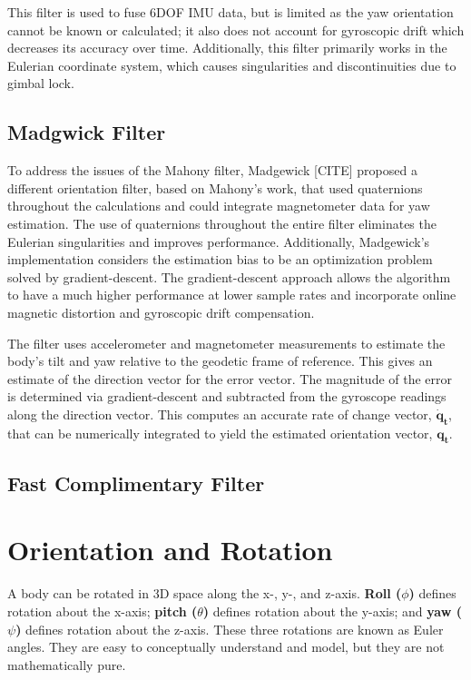 This filter is used to fuse 6DOF IMU data, but is limited as the yaw orientation cannot be known or calculated; it also does not account for gyroscopic drift which decreases its accuracy over time.
Additionally, this filter primarily works in the Eulerian coordinate system, which causes singularities and discontinuities due to gimbal lock.

\subsection{Madgwick Filter} \label{ssec:bkg_madgewick_filter}
To address the issues of the Mahony filter, Madgewick [CITE] proposed a different orientation filter, based on Mahony's work, that used quaternions throughout the calculations and could integrate magnetometer data for yaw estimation.
The use of quaternions throughout the entire filter eliminates the Eulerian singularities and improves performance.
Additionally, Madgewick's implementation considers the estimation bias to be an optimization problem solved by gradient-descent.
The gradient-descent approach allows the algorithm to have a much higher performance at lower sample rates and incorporate online magnetic distortion and gyroscopic drift compensation.

The filter uses accelerometer and magnetometer measurements to estimate the body's tilt and yaw relative to the geodetic frame of reference.
This gives an estimate of the direction vector for the error vector.
The magnitude of the error is determined via gradient-descent and subtracted from the gyroscope readings along the direction vector.
This computes an accurate rate of change vector, $\pmb{\dot{q}_t}$, that can be numerically integrated to yield the estimated orientation vector, $\pmb{q_t}$.

\subsection{Fast Complimentary Filter}


\section{Orientation and Rotation} \label{ssec:bkg_orientation}
A body can be rotated in 3D space along the x-, y-, and z-axis.
\textbf{Roll ($\phi$)} defines rotation about the x-axis; \textbf{pitch ($\theta$)} defines rotation about the y-axis; and \textbf{yaw ($\psi$)} defines rotation about the z-axis.
These three rotations are known as Euler angles.
They are easy to conceptually understand and model, but they are not mathematically pure.

